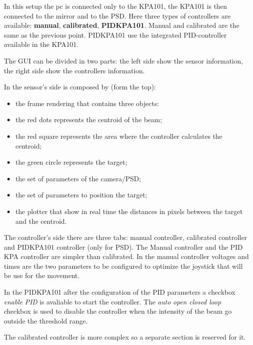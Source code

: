 In this setup the pc is connected only to the KPA101, the KPA101 is
then connected to the mirror and to the PSD. Here three types of controllers are available: \textbf{manual}, \textbf{calibrated}, \textbf{PIDKPA101}. Manual and calibrated are the same as the previous point. PIDKPA101 use the integrated PID-controller available in the KPA101.



The GUI can be divided in two parts: the left side show the sensor
information, the right side show the controllers information.

In the sensor's side is composed by (form the top):

\begin{itemize}
  \itemsep1pt\parskip0pt
  \item
        the frame rendering that contains three objects:
  \item
        the red dots represents the centroid of the beam;
  \item
        the red square represents the area where the controller calculates the
        centroid;
  \item
        the green circle represents the target;
  \item
        the set of parameters of the camera/PSD;
  \item
        the set of parameters to position the target;
  \item
        the plotter that show in real time the distances in pixels between the
        target and the centroid.
\end{itemize}

The controller's side there are three tabs: manual controller, calibrated
controller and PIDKPA101 controller (only for PSD). The Manual
controller and the PID KPA controller are simpler than calibrated. In the manual
controller voltages and times are the two parameters to be configured to optimize the joystick that will be use for the movement.

In the PIDKPA101 after the configuration of the PID parameters a checkbox \emph{enable PID}
is avaliable to start the controller. The \emph{auto open closed loop} checkbox is used to
disable the controller when the intensity of the beam go outside the
threshold range.

The calibrated controller is more complex so a separate
section is reserved for it.

